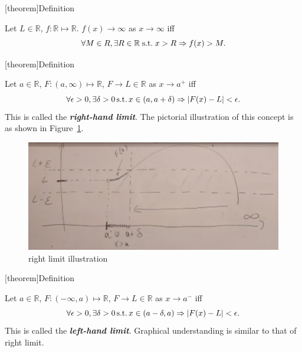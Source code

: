\documentclass[12pt]{report}
\theoremstyle{definition}
\begin{document}
[theorem]{Definition}
\begin{f tends to infinity as x tends to infinity}
    Let $L \in \mathbb{R}$, $f:\mathbb{R}\mapsto\mathbb{R}$. 
    $f(x) \rightarrow{} \infty$ as $x\rightarrow{}\infty$ iff\[
        \forall M \in R, \exists R\in\mathbb{R}\;\textnormal{s.t.}\;x>R\Rightarrow{}f(x)>M.
    \]
\end{f tends to infinity as x tends to infinity}

[theorem]{Definition}
\begin{right limit}
    Let $a \in \mathbb{R}$, $F: (a, \infty) \mapsto \mathbb{R}$, $F \rightarrow{}L \in \mathbb{R}$
    as $x \rightarrow{}a^{+}$ iff\[
        \forall \epsilon > 0, \exists \delta > 0 \,\textnormal{s.t.}\,
        x \in (a, a + \delta) \Rightarrow{}|F(x) - L| < \epsilon.
    \]
    This is called the \textbf{\emph{right-hand limit}}.
    The pictorial illustration of this concept is as shown in Figure~\ref{fig:rightLimit}.
\end{right limit}

\begin{figure}
  	\includegraphics[scale=0.5]{rightLimit.png}
  	\centering
    \caption{right limit illustration}\label{fig:rightLimit}
\end{figure}

[theorem]{Definition}
\begin{left limit}
    Let $a \in \mathbb{R}$, $F: (-\infty, a) \mapsto \mathbb{R}$, $F \rightarrow{}L \in \mathbb{R}$
    as $x \rightarrow{}a^{-}$ iff\[
        \forall \epsilon > 0, \exists \delta > 0 \,\textnormal{s.t.}\,
        x \in (a - \delta, a) \Rightarrow{}|F(x) - L| < \epsilon.
    \]
    This is called the \textbf{\emph{left-hand limit}}.
    Graphical understanding is similar to that of right limit.
\end{left limit}
\end{document}

